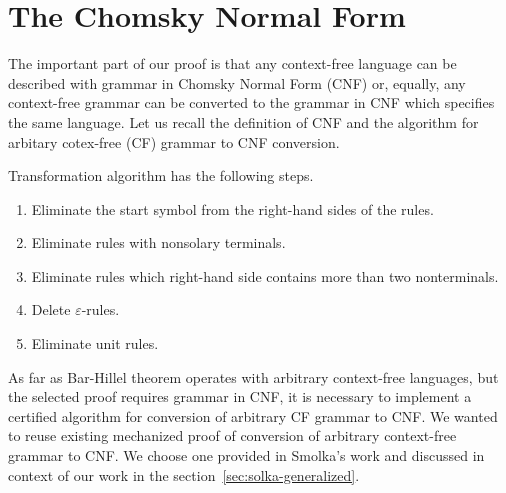\section{The Chomsky Normal Form}
\label{sec:cnf}

The important part of our proof is that any context-free language can be described with grammar in Chomsky Normal Form (CNF) or, equally, any context-free grammar can be converted to the grammar in CNF which specifies the same language.
Let us recall the definition of CNF and the algorithm for arbitary cotex-free (CF) grammar to CNF conversion.

Transformation algorithm has the following steps.
\begin{enumerate}
\item Eliminate the start symbol from the right-hand sides of the rules.
\item Eliminate rules with nonsolary terminals.
\item Eliminate rules which right-hand side contains more than two nonterminals.
\item Delete $\varepsilon$-rules.
\item Eliminate unit rules.
\end{enumerate}

As far as Bar-Hillel theorem operates with arbitrary context-free languages, but the selected proof requires grammar in CNF, it is necessary to implement a certified algorithm for conversion of arbitrary CF grammar to CNF.
We wanted to reuse existing mechanized proof of conversion of arbitrary context-free grammar to CNF.
We choose one provided in Smolka's work and discussed in context of our work in the section~\ref{sec:solka-generalized}.



